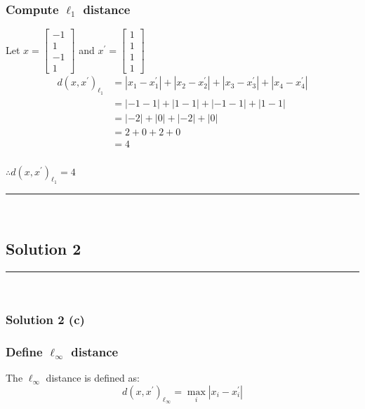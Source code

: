 \documentclass{article}
\begin{document}
\subsubsection*{Compute $\ell_{1}$ distance}
\parbox{\textwidth}{
Let $x = \begin{bmatrix} -1 \\ 1 \\ -1 \\ 1 \end{bmatrix}$ and $x^{\prime}=\begin{bmatrix} 1 \\ 1 \\ 1 \\ 1 \end{bmatrix}$
\begin{align*}
    d(x, x^{\prime})_{\ell_1} &= |x_{1}-x_{1}^{\prime}| + |x_{2}-x_{2}^{\prime}| + |x_{3}-x_{3}^{\prime}| + |x_{4}-x_{4}^{\prime}| \\
    &= |-1 - 1| + |1 - 1| + |-1 - 1| + |1 - 1| \\
    &= |-2| + |0| + |-2| + |0| \\
    &= 2 + 0 + 2 + 0 \\
    &= 4
\end{align*}
}
\subsubsection*{\normalfont}{$\therefore d(x, x^{\prime})_{\ell_1} = 4$}

\noindent\rule{\textwidth}{0.4pt}\\

\newpage

\subsection*{Solution 2}
\noindent\rule{\textwidth}{0.4pt}\\
\subsubsection*{Solution 2 (c)}

\subsubsection*{Define $\ell_{\infty}$ distance}
\parbox{\textwidth}{The $\ell_\infty$ distance is defined as:
$$d(x, x^{\prime})_{\ell_\infty} = \max_{i} |x_i - x_{i}^{\prime}|$$
}
\end{document}
